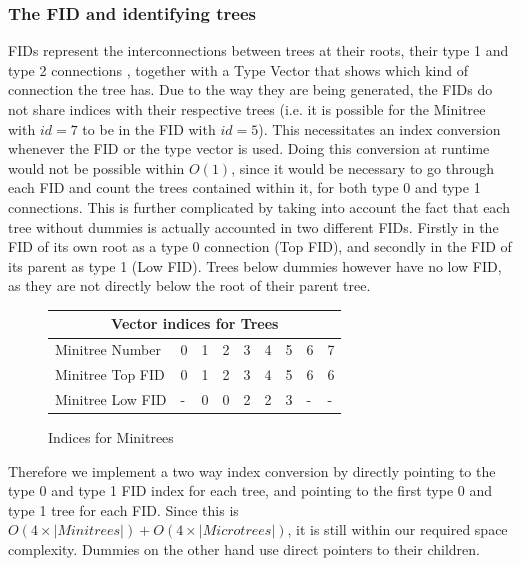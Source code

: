 \documentclass{article}
\begin{document}
\subsubsection{The FID and identifying trees}
FIDs represent the interconnections between trees at their roots, their type 1 and type 2 connections \cite{farzanMunro}, together with a Type Vector that shows which kind of connection the tree has.
Due to the way they are being generated, the FIDs do not share indices with their respective trees (i.e. it is possible for the Minitree with $id = 7$ to be in the FID with $id = 5$).
This necessitates an index conversion whenever the FID or the type vector is used. Doing this conversion at runtime would not be possible within $O(1)$, since it would be necessary to go through each FID and count the trees contained within it, for both type 0 and type 1 connections.
This is further complicated by taking into account the fact that each tree without dummies is actually accounted in two different FIDs. Firstly in the FID of its own root as a type 0 connection (Top FID), and secondly in the FID of its parent as type 1 (Low FID). Trees below dummies however have no low FID, as they are not directly below the root of their parent tree.
\begin{figure}[h]
	\begin{tabular}{ |p{3.5cm}||p{0.5cm}|p{0.5cm}|p{0.5cm}|p{0.5cm}|p{0.5cm}|p{0.5cm}|p{0.5cm}|p{0.5cm}|  }
		 \hline
		 \multicolumn{9}{|c|}{Vector indices for Trees} \\
		 \hline
		 Minitree Number & 0 & 1& 2 & 3 & 4 & 5 & 6 & 7\\
		 Minitree Top FID& 0 & 1 & 2 & 3 & 4 & 5 & 6 & 6\\
		 Minitree Low FID& - & 0 & 0 & 2 & 2 & 3 & - & -\\
		 \hline
	\end{tabular}
\caption{Indices for Minitrees}
\label{fid:table1}
\end{figure}
Therefore we implement a two way index conversion by directly pointing to the type 0 and type 1 FID index for each tree, and pointing to the first type 0 and type 1 tree for each FID. Since this is $O(4 \times |Minitrees|) + O(4 \times |Microtrees|)$, it is still within our required space complexity. Dummies on the other hand use direct pointers to their children.\\
\end{document}
